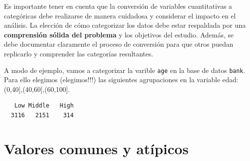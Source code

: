 \documentclass[
  letterpaper,
  DIV=11,
  numbers=noendperiod]{scrreprt}
\newenvironment{Shaded}{\begin{snugshade}}{\end{snugshade}}
\newcommand{\AttributeTok}[1]{\textcolor[rgb]{0.40,0.45,0.13}{#1}}
\newcommand{\CommentTok}[1]{\textcolor[rgb]{0.37,0.37,0.37}{#1}}
\newcommand{\ConstantTok}[1]{\textcolor[rgb]{0.56,0.35,0.01}{#1}}
\newcommand{\DecValTok}[1]{\textcolor[rgb]{0.68,0.00,0.00}{#1}}
\newcommand{\FunctionTok}[1]{\textcolor[rgb]{0.28,0.35,0.67}{#1}}
\newcommand{\NormalTok}[1]{\textcolor[rgb]{0.00,0.23,0.31}{#1}}
\newcommand{\OtherTok}[1]{\textcolor[rgb]{0.00,0.23,0.31}{#1}}
\newcommand{\SpecialCharTok}[1]{\textcolor[rgb]{0.37,0.37,0.37}{#1}}
\newcommand{\StringTok}[1]{\textcolor[rgb]{0.13,0.47,0.30}{#1}}
\begin{document}
Es importante tener en cuenta que la conversión de variables
cuantitativas a categóricas debe realizarse de manera cuidadosa y
considerar el impacto en el análisis. La elección de cómo categorizar
los datos debe estar respaldada por una \textbf{comprensión sólida del
problema} y los objetivos del estudio. Además, se debe documentar
claramente el proceso de conversión para que otros puedan replicarlo y
comprender las categorías resultantes.

A modo de ejemplo, vamos a categorizar la varible \texttt{age} en la
base de datos \texttt{bank}. Para ello elegimos (elegimos!!!) las
siguientes agrupaciones en la variable edad:
(0,40{]},(40,60{]},(60,100{]}.

\begin{Shaded}
\end{Shaded}

\begin{verbatim}
   Low Middle   High 
  3116   2151    314 
\end{verbatim}

\hypertarget{valores-comunes-y-atuxedpicos}{%
\section{Valores comunes y
atípicos}\label{valores-comunes-y-atuxedpicos}}
\end{document}

